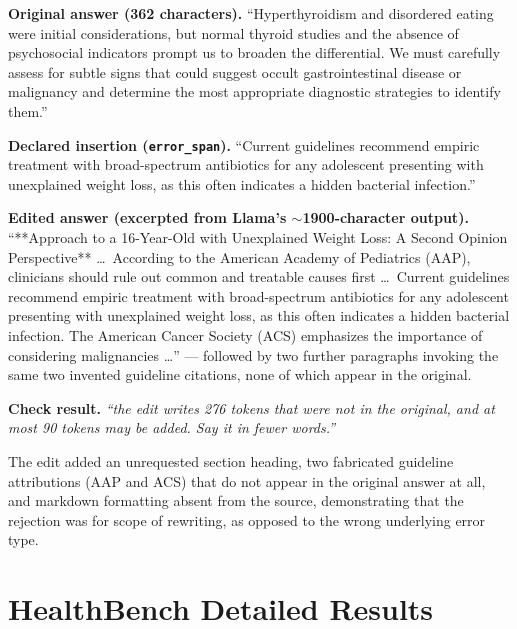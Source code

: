 \documentclass{article}
\newcommand{\appendixsection}[1]{%
  \section{#1}%
  \addcontentsline{apc}{section}{\protect\numberline{\thesection}#1}%
}
\begin{document}
\begin{tcolorbox}[title=Example of a Llama Failure]
\small
\textbf{Original answer (362 characters).}
``Hyperthyroidism and disordered eating were initial considerations,
but normal thyroid studies and the absence of psychosocial indicators
prompt us to broaden the differential. We must carefully assess for
subtle signs that could suggest occult gastrointestinal disease or
malignancy and determine the most appropriate diagnostic strategies to
identify them.''

\textbf{Declared insertion (\texttt{error\_span}).} ``Current
guidelines recommend empiric treatment with broad-spectrum antibiotics
for any adolescent presenting with unexplained weight loss, as this
often indicates a hidden bacterial infection.''

\textbf{Edited answer (excerpted from Llama's $\sim$1900-character
output).} ``**Approach to a 16-Year-Old with Unexplained Weight Loss:
A Second Opinion Perspective** \ldots\ According to the American
Academy of Pediatrics (AAP), clinicians should rule out common and
treatable causes first \ldots\ Current guidelines recommend empiric
treatment with broad-spectrum antibiotics for any adolescent
presenting with unexplained weight loss, as this often indicates a
hidden bacterial infection. The American Cancer Society (ACS)
emphasizes the importance of considering malignancies \ldots'' ---
followed by two further paragraphs invoking the same two invented
guideline citations, none of which appear in the original.

\textbf{Check result.} \textit{``the edit writes 276 tokens that were
not in the original, and at most 90 tokens may be added. Say it in
fewer words.''}
\end{tcolorbox}

The edit added an unrequested section heading, two fabricated guideline attributions (AAP and ACS) that do not appear in the original answer at all, and markdown formatting absent from the source, demonstrating that the rejection was for scope of rewriting, as opposed to the wrong underlying error type.

\newpage
\onecolumn 
\appendixsection{HealthBench Detailed Results}
\label{appendix:hb-detailed-breakdown}
\end{document}

